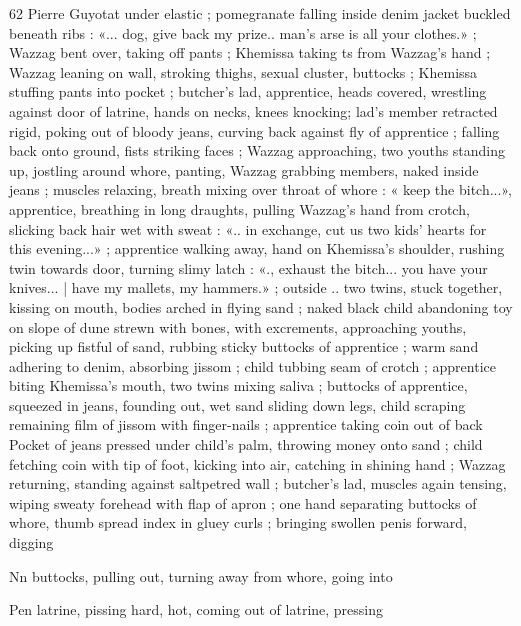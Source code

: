62 Pierre Guyotat
under elastic ; pomegranate falling inside denim jacket buckled
beneath ribs : «... dog, give back my prize.. man’s arse is all your
clothes.» ; Wazzag bent over, taking off pants ; Khemissa taking
ts from Wazzag's hand ; Wazzag leaning on wall, stroking thighs,
sexual cluster, buttocks ; Khemissa stuffing pants into pocket ;
butcher's lad, apprentice, heads covered, wrestling against door of
latrine, hands on necks, knees knocking; lad’s member retracted
rigid, poking out of bloody jeans, curving back against fly of
apprentice ; falling back onto ground, fists striking faces ; Wazzag
approaching, two youths standing up, jostling around whore, panting,
Wazzag grabbing members, naked inside jeans ; muscles relaxing,
breath mixing over throat of whore : « keep the bitch...», apprentice,
breathing in long draughts, pulling Wazzag's hand from crotch,
slicking back hair wet with sweat : «.. in exchange, cut us two kids’
hearts for this evening...» ; apprentice walking away, hand on
Khemissa's shoulder, rushing twin towards door, turning slimy latch :
«., exhaust the bitch... you have your knives... | have my mallets, my
hammers.» ; outside .. two twins, stuck together, kissing on mouth,
bodies arched in flying sand ; naked black child abandoning toy on
slope of dune strewn with bones, with excrements, approaching
youths, picking up fistful of sand, rubbing sticky buttocks of
apprentice ; warm sand adhering to denim, absorbing jissom ; child
tubbing seam of crotch ; apprentice biting Khemissa's mouth, two
twins mixing saliva ; buttocks of apprentice, squeezed in jeans,
founding out, wet sand sliding down legs, child scraping remaining
film of jissom with finger-nails ; apprentice taking coin out of back
Pocket of jeans pressed under child's palm, throwing money onto
sand ; child fetching coin with tip of foot, kicking into air, catching in
shining hand ; Wazzag returning, standing against saltpetred wall ;
butcher's lad, muscles again tensing, wiping sweaty forehead with
flap of apron ; one hand separating buttocks of whore, thumb spread
index in gluey curls ; bringing swollen penis forward, digging

Nn buttocks, pulling out, turning away from whore, going into

Pen latrine, pissing hard, hot, coming out of latrine, pressing

